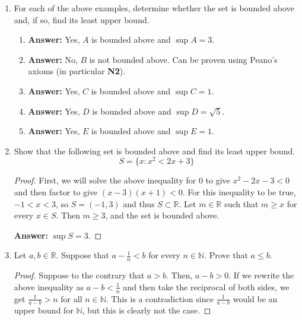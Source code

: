 \documentclass{article}
\begin{document}
\begin{enumerate}
\begin{enumerate}
            \end{enumerate}
            
        \item For each of the above examples, determine whether the set is bounded above and, if so, find its least upper bound.
            \begin{enumerate}
                \item \textbf{Answer:} Yes, $A$ is bounded above and $\sup A = 3$.
                    
                \item \textbf{Answer:} No, $B$ is not bounded above. Can be proven using Peano's axioms (in particular \textbf{N2}).
                    
                \item \textbf{Answer:} Yes, $C$ is bounded above and $\sup C = 1$.
                    
                \item \textbf{Answer:} Yes, $D$ is bounded above and $\sup D = \sqrt{5}$.
                    
                \item \textbf{Answer:} Yes, $E$ is bounded above and $\sup E = 1$.\\
                    
            \end{enumerate}
            
        
        \item Show that the following set is bounded above and find its least upper bound.
            \[S = \{x : x^2 < 2x+3\}\]
            
            \begin{proof}
                First, we will solve the above inequality for $0$ to give $x^2 - 2x - 3 < 0$ and then factor to give $(x - 3)(x + 1) < 0$. For this inequality to be true, $-1 < x < 3$, so $S = (-1, 3)$ and thus $S \subset \mathbb{R}$. Let $m \in \mathbb{R}$ such that $m \geq x$ for every $x \in S$. Then $m \geq 3$, and the set is bounded above.
                
                \textbf{Answer:} $\sup S = 3$.
            
            \end{proof}
        
        \item Let $a,b \in \mathbb{R}$. Suppose that $a - \frac{1}{n} < b$ for every $n \in \mathbb{N}$. Prove that $a \leq b$.
            \begin{proof}
                Suppose to the contrary that $a > b$. Then, $a - b > 0$. If we rewrite the above inequality as $a-b < \frac{1}{n}$ and then take the reciprocal of both sides, we get $\frac{1}{a-b} > n$ for all $n \in \mathbb{N}$. This is a contradiction since $\frac{1}{a-b}$ would be an upper bound for $\mathbb{N}$, but this is clearly not the case.
                

\end{proof}
\end{enumerate}
\end{document}
